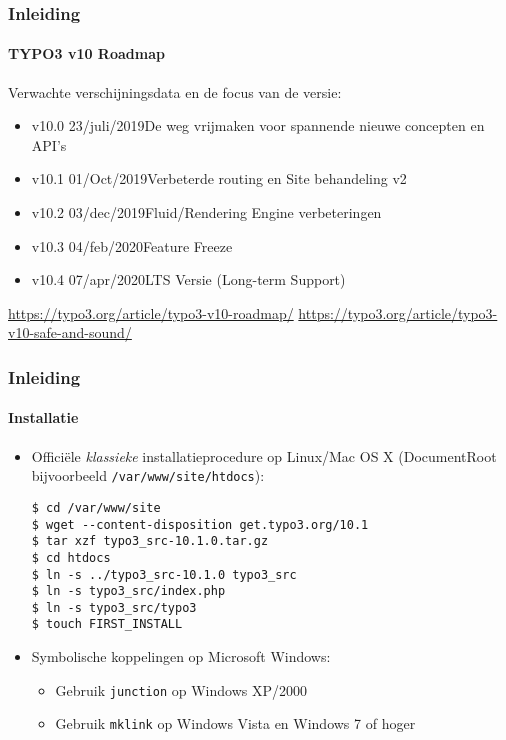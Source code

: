 
\begin{frame}[fragile]
	\frametitle{Inleiding}
	\framesubtitle{TYPO3 v10 Roadmap}

	Verwachte verschijningsdata en de focus van de versie:

	\begin{itemize}

		\item v10.0 \tabto{1.1cm}23/juli/2019\tabto{3.4cm}De weg vrijmaken voor spannende nieuwe concepten en API's

		\item
			\begingroup
				\color{typo3orange}
				v10.1 \tabto{1.1cm}01/Oct/2019\tabto{3.4cm}Verbeterde routing en Site behandeling v2
			\endgroup
		\item v10.2 \tabto{1.1cm}03/dec/2019\tabto{3.4cm}Fluid/Rendering Engine verbeteringen
		\item v10.3 \tabto{1.1cm}04/feb/2020\tabto{3.4cm}Feature Freeze
		\item v10.4 \tabto{1.1cm}07/apr/2020\tabto{3.4cm}LTS Versie (Long-term Support)

	\end{itemize}

	\smaller
		\url{https://typo3.org/article/typo3-v10-roadmap/}\newline
		\url{https://typo3.org/article/typo3-v10-safe-and-sound/}
	\normalsize

\end{frame}


\begin{frame}[fragile]
	\frametitle{Inleiding}
	\framesubtitle{Installatie}

	\begin{itemize}
		\item Offici\"ele \textit{klassieke} installatieprocedure op Linux/Mac OS X\newline
		(DocumentRoot bijvoorbeeld \texttt{/var/www/site/htdocs}):
		\begin{lstlisting}
$ cd /var/www/site
$ wget --content-disposition get.typo3.org/10.1
$ tar xzf typo3_src-10.1.0.tar.gz
$ cd htdocs
$ ln -s ../typo3_src-10.1.0 typo3_src
$ ln -s typo3_src/index.php
$ ln -s typo3_src/typo3
$ touch FIRST_INSTALL
		\end{lstlisting}

		\item Symbolische koppelingen op Microsoft Windows:

			\begin{itemize}
				\item Gebruik \texttt{junction} op Windows XP/2000
				\item Gebruik \texttt{mklink} op Windows Vista en Windows 7 of hoger
			\end{itemize}

	\end{itemize}
\end{frame}

